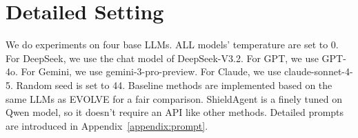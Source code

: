 \section{Detailed Setting}
\label{appendix:setting}
We do experiments on four base LLMs. ALL models' temperature are set to 0. For DeepSeek, we use the chat model of DeepSeek-V3.2. For GPT, we use GPT-4o. For Gemini, we use gemini-3-pro-preview. For Claude, we use claude-sonnet-4-5. Random seed is set to 44. Baseline methods are implemented based on the same LLMs as EVOLVE for a fair comparison. ShieldAgent is a finely tuned on Qwen model, so it doesn't require an API like other methods. Detailed prompts are introduced in Appendix~\ref{appendix:prompt}. 